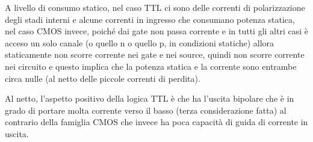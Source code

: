 \documentclass[12pt, a4paper]{report}
\begin{document}
A livello di consumo statico, nel caso TTL ci sono delle correnti di polarizzazione degli stadi interni e alcune correnti in ingresso che consumano potenza statica, nel caso CMOS invece, poiché dai gate non passa corrente e in tutti gli altri casi è acceso un solo canale (o quello n o quello p, in condizioni statiche) allora staticamente non scorre corrente nei gate e nei source, quindi non scorre corrente nei circuito e questo implica che la potenza statica e la corrente sono entrambe circa nulle (al netto delle piccole correnti di perdita).

Al netto, l'aspetto positivo della logica TTL è che ha l'uscita bipolare che è in grado di portare molta corrente verso il basso (terza considerazione fatta) al contrario della famiglia CMOS che invece ha poca capacità di guida di corrente in uscita.
\end{document}
